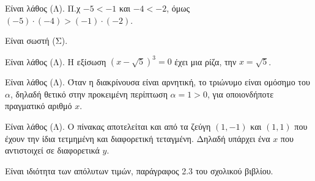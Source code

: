 
\begin{alist}
\item
\begin{rlist}
\item Είναι λάθος (Λ). Π.χ $-5 < -1$ και $-4 < -2$, όμως $(-5) \cdot (-4) > (-1) \cdot (-2)$.
\item Είναι σωστή (Σ).
\item Είναι λάθος (Λ). Η εξίσωση $(x - \sqrt{5})^3 = 0$ έχει μια ρίζα, την $x = \sqrt{5}$.
\item Είναι λάθος (Λ). Όταν η διακρίνουσα είναι αρνητική, το τριώνυμο είναι ομόσημο του $\alpha$,
δηλαδή θετικό στην προκειμένη περίπτωση $\alpha = 1 > 0$, για οποιονδήποτε πραγματικό αριθμό $x$.
\item Είναι λάθος (Λ). Ο πίνακας αποτελείται και από τα ζεύγη $(1, -1)$ και $(1, 1)$ που έχουν την
ίδια τετμημένη και διαφορετική τεταγμένη. Δηλαδή υπάρχει ένα $x$ που αντιστοιχεί σε
διαφορετικά $y$.
\end{rlist}

\item Είναι ιδιότητα των απόλυτων τιμών, παράγραφος 2.3 του σχολικού βιβλίου.
\end{alist}

